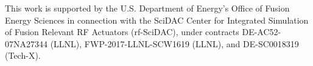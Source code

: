This work is supported by the U.S. Department of Energy’s Office of Fusion Energy Sciences in 
connection with the SciDAC Center for Integrated Simulation of Fusion Relevant RF Actuators 
(rf-SciDAC), under contracts DE-AC52-07NA27344 (LLNL), FWP-2017-LLNL-SCW1619 (LLNL), and 
DE-SC0018319 (Tech-X).
